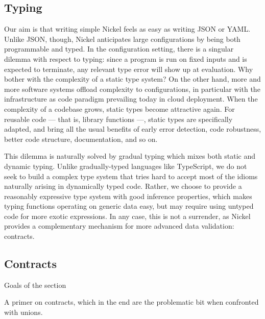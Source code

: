 \documentclass[sigplan,10pt,review,anonymous]{acmart}
\newcommand{\unsure}[2][1=]{}
\begin{document}
\subsection{Typing}

Our aim is that writing simple Nickel feels as easy as writing JSON or YAML.
Unlike JSON, though, Nickel anticipates large configurations by being both
programmable and typed. In the configuration setting, there is a singular
dilemma with respect to typing: since a program is run on fixed inputs and is
expected to terminate, any relevant type error will show up at evaluation.  Why
bother with the complexity of a static type system? On the other hand, more and
more software systems offload complexity to configurations, in particular with
the infrastructure as code paradigm prevailing today in cloud deployment. When
the complexity of a codebase grows, static types become attractive again.  For
reusable code — that is, library functions —, static types are specifically
adapted, and bring all the usual benefits of early error detection, code
robustness, better code structure, documentation, and so on.

This dilemma is naturally solved by gradual typing\cite{Siek06gradualtyping}
which mixes both static and dynamic typing. Unlike gradually-typed languages
like TypeScript\unsure{Todo: explain that typescript uses unions as
  static typing whereas we are speaking of dynamic contracts}, we do not seek to build a complex type system that tries hard
to accept most of the idioms naturally arising in dynamically typed code.
Rather, we choose to provide a reasonably expressive type system with good
inference properties, which makes typing functions operating on generic data easy,
but may require using untyped code for more exotic expressions.  In any case,
this is not a surrender, as Nickel provides a complementary mechanism for more
advanced data validation: contracts.

\subsection{Contracts}
{\color{red}Goals of the section

A primer on contracts, which in the end are the problematic bit when confronted
with unions.\vspace{0.5cm}}
\end{document}
